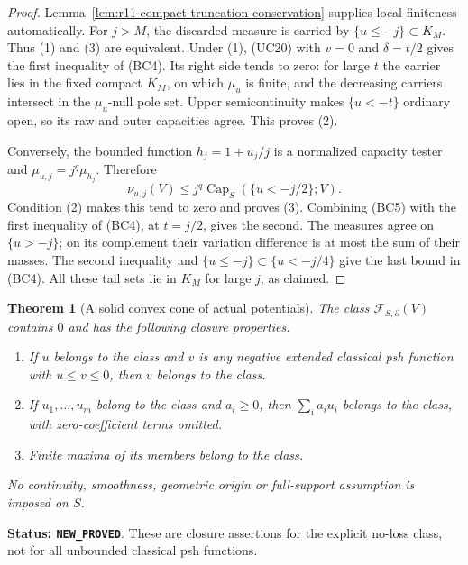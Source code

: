 \documentclass[11pt,a4paper]{article}
\numberwithin{equation}{section}
\newtheorem{theorem}{Theorem}[section]
\theoremstyle{definition}
\theoremstyle{remark}
\begin{document}
\begin{proof}
Lemma~\ref{lem:r11-compact-truncation-conservation} supplies local
finiteness automatically. For $j>M$, the discarded measure is
carried by $\{u\leq-j\}\subset K_M$. Thus (1) and (3) are
equivalent. Under (1), (UC20) with $v=0$ and $\delta=t/2$
gives the first inequality of (BC4). Its right side tends to zero:
for large $t$ the carrier lies in the fixed compact $K_M$, on
which $\mu_u$ is finite, and the decreasing carriers intersect
in the $\mu_u$-null pole set. Upper semicontinuity makes
$\{u<-t\}$ ordinary open, so its raw and outer capacities agree.
This proves (2).

Conversely, the bounded function $h_j=1+u_j/j$ is a normalized
capacity tester and $\mu_{u,j}=j^q\mu_{h_j}$. Therefore
\[
 \nu_{u,j}(V)
    \leq j^q\operatorname{Cap}_S(\{u<-j/2\};V).
 \tag{BC5}
\]
Condition (2) makes this tend to zero and proves (3).
Combining (BC5) with the first inequality of (BC4), at $t=j/2$,
gives the second. The measures agree on $\{u>-j\}$; on its
complement their variation difference is at most the sum of their
masses. The second inequality and
$\{u\leq-j\}\subset\{u<-j/4\}$ give the last bound in
(BC4). All these tail sets lie in $K_M$ for large $j$, as claimed.
\end{proof}

\begin{theorem}[A solid convex cone of actual potentials]
\label{thm:r11-solid-boundary-cone}
The class $\mathcal F_{S,\partial}(V)$ contains $0$ and has the
following closure properties.
\begin{enumerate}
\item If $u$ belongs to the class and $v$ is any negative extended
classical psh function with $u\leq v\leq0$, then $v$ belongs
to the class.
\item If $u_1,\ldots,u_m$ belong to the class and $a_i\geq0$,
then $\sum_i a_i u_i$ belongs to the class, with zero-coefficient
terms omitted.
\item Finite maxima of its members belong to the class.
\end{enumerate}
No continuity, smoothness, geometric origin or full-support
assumption is imposed on $S$.
\end{theorem}

\noindent\textbf{Status: \texttt{NEW\_PROVED}}. These are
closure assertions for the explicit no-loss class, not for all
unbounded classical psh functions.
\end{document}
